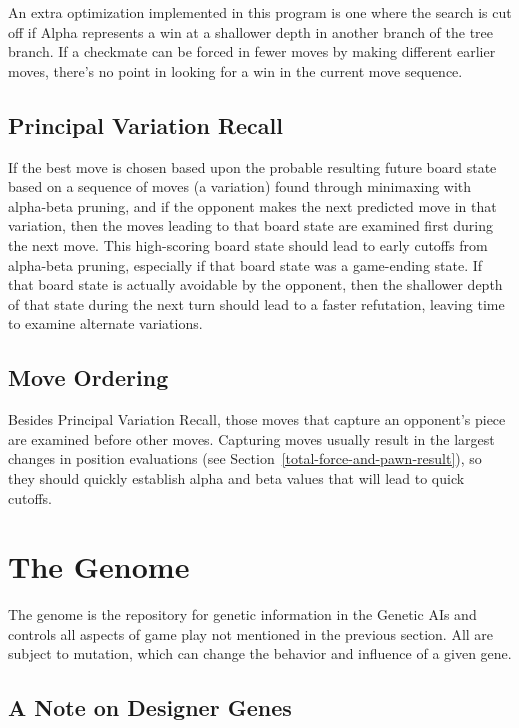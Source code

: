 \documentclass[letterpaper]{article}
\renewcommand{\_}{\allowbreak\textunderscore\allowbreak}
\begin{document}
An extra optimization implemented in this program is one where the search is cut off if Alpha represents a win at a shallower depth in another branch of the tree branch. If a checkmate can be forced in fewer moves by making different earlier moves, there's no point in looking for a win in the current move sequence.

\subsection{Principal Variation Recall}

If the best move is chosen based upon the probable resulting future board state based on a sequence of moves (a variation) found through minimaxing with alpha-beta pruning, and if the opponent makes the next predicted move in that variation, then the moves leading to that board state are examined first during the next move. This high-scoring board state should lead to early cutoffs from alpha-beta pruning, especially if that board state was a game-ending state. If that board state is actually avoidable by the opponent, then the shallower depth of that state during the next turn should lead to a faster refutation, leaving time to examine alternate variations.

\subsection{Move Ordering}

Besides Principal Variation Recall, those moves that capture an opponent's piece are examined before other moves. Capturing moves usually result in the largest changes in position evaluations (see Section~\ref{total-force-and-pawn-result}), so they should quickly establish alpha and beta values that will lead to quick cutoffs.

\section{The Genome}\label{gene-section}
The genome is the repository for genetic information in the Genetic AIs and controls all aspects of game play not mentioned in the previous section. All are subject to mutation, which can change the behavior and influence of a given gene.

\subsection{A Note on Designer Genes}
\end{document}
